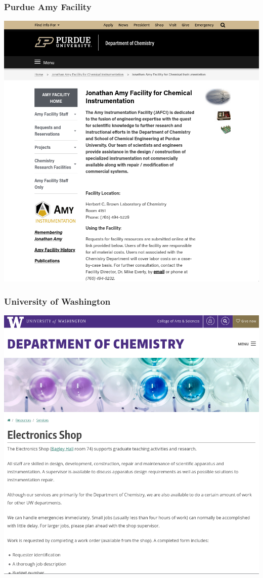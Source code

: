 \documentclass{presentation}
\begin{document}
{\begin{frame}\frametitle{Purdue Amy Facility}
  \includegraphics[width=\textwidth]{"./amy.png"}
\end{frame}

\begin{frame}\frametitle{University of Washington}
  \includegraphics[width=\textwidth]{"./washington.png"}
\end{frame}

}
\end{document}
